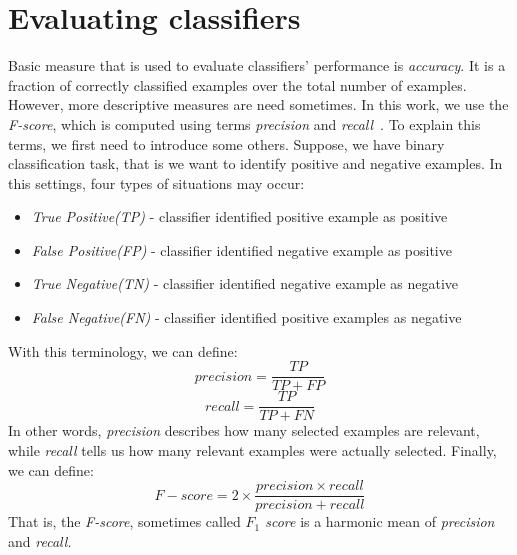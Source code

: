 \section{Evaluating classifiers}
Basic measure that is used to evaluate classifiers' performance is \textit{accuracy}.
It is a fraction of correctly classified examples over the total number of examples.
However, more descriptive measures are need sometimes.
In this work, we use the \textit{F-score}, which is computed using terms \textit{precision} and \textit{recall}~\cite{sokolova2006beyond}.
To explain this terms, we first need to introduce some others.
Suppose, we have binary classification task, that is we want to identify positive and negative examples.
In this settings, four types of situations may occur:
\begin{itemize}
\item \textit{True Positive(TP)} - classifier identified positive example as positive
\item \textit{False Positive(FP)} - classifier identified negative example as positive
\item \textit{True Negative(TN)} - classifier identified negative example as negative
\item \textit{False Negative(FN)} - classifier identified positive examples as negative
\end{itemize}
\par
With this terminology, we can define:
\begin{equation}
precision = \frac{TP}{TP + FP}
\end{equation}
\begin{equation}
recall = \frac{TP}{TP + FN}
\end{equation}
In other words, \textit{precision} describes how many selected examples are relevant, while \textit{recall} tells us how many relevant examples were actually selected.
Finally, we can define:
\begin{equation}
F-score = 2 \times \frac{precision \times recall}{precision + recall}
\end{equation}
That is, the \textit{F-score}, sometimes called \textit{$F_1$ score} is a harmonic mean of \textit{precision} and \textit{recall.}
